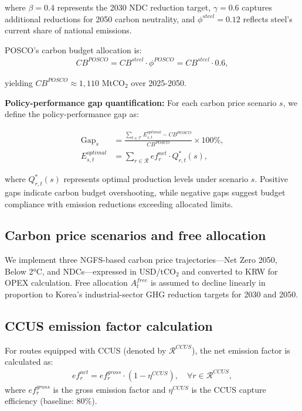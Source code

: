 \documentclass[preprint,1p,authoryear]{elsarticle}
\begin{document}
where $\beta = 0.4$ represents the 2030 NDC reduction target, $\gamma = 0.6$ captures additional reductions for 2050 carbon neutrality, and $\phi^{steel} = 0.12$ reflects steel's current share of national emissions.

POSCO's carbon budget allocation is:
\begin{align}
CB^{POSCO} = CB^{steel} \cdot \phi^{POSCO} = CB^{steel} \cdot 0.6, \label{eq:posco_budget}
\end{align}

yielding $CB^{POSCO} \approx 1{,}110$ MtCO$_2$ over 2025-2050.

\textbf{Policy-performance gap quantification:}
For each carbon price scenario $s$, we define the policy-performance gap as:

\begin{align}
\text{Gap}_s &= \frac{\sum_{t \in \mathcal{T}} E_{s,t}^{optimal} - CB^{POSCO}}{CB^{POSCO}} \times 100\%, \label{eq:gap}\\
E_{s,t}^{optimal} &= \sum_{r \in \mathcal{R}} ef_r^{net} \cdot Q_{r,t}^*(s), \label{eq:optimal_emissions}
\end{align}

where $Q_{r,t}^*(s)$ represents optimal production levels under scenario $s$. Positive gaps indicate carbon budget overshooting, while negative gaps suggest budget compliance with emission reductions exceeding allocated limits.

\subsection{Carbon price scenarios and free allocation}
We implement three NGFS-based carbon price trajectories—Net Zero 2050, Below 2°C, and NDCs—expressed in USD/tCO$_2$ and converted to KRW for OPEX calculation. Free allocation $A^{free}_t$ is assumed to decline linearly in proportion to Korea's industrial-sector GHG reduction targets for 2030 and 2050.

\subsection{CCUS emission factor calculation}
For routes equipped with CCUS (denoted by $\mathcal{R}^{CCUS}$), the net emission factor is calculated as:
\begin{align}
ef_r^{net} = ef_r^{gross} \cdot (1 - \eta^{CCUS}), \quad \forall r \in \mathcal{R}^{CCUS},
\end{align}
where $ef_r^{gross}$ is the gross emission factor and $\eta^{CCUS}$ is the CCUS capture efficiency (baseline: 80\%).
\end{document}
